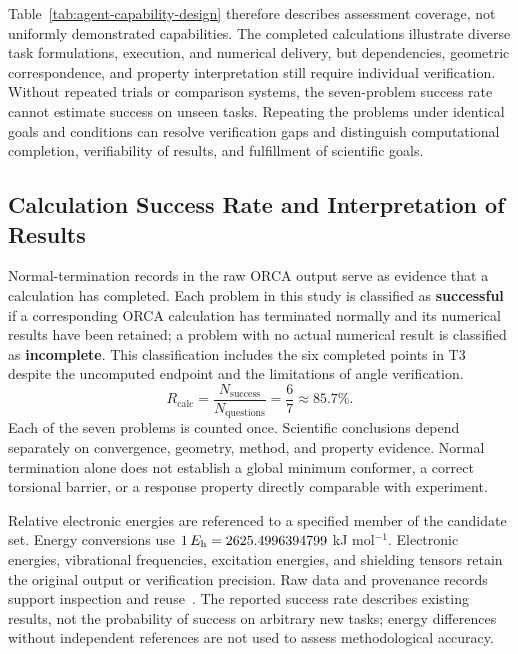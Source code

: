 Table~\ref{tab:agent-capability-design} therefore describes assessment coverage, not uniformly demonstrated capabilities.
The completed calculations illustrate diverse task formulations, execution, and numerical delivery,
but dependencies, geometric correspondence, and property interpretation still require individual verification.
Without repeated trials or comparison systems, the seven-problem success rate cannot estimate success on unseen tasks.
Repeating the problems under identical goals and conditions can resolve verification gaps
and distinguish computational completion, verifiability of results, and fulfillment of scientific goals.

\subsection{Calculation Success Rate and Interpretation of Results}
Normal-termination records in the raw ORCA output serve as evidence that a calculation has completed.
Each problem in this study is classified as \textbf{successful} if a corresponding ORCA calculation has terminated normally
and its numerical results have been retained; a problem with no actual numerical result is classified as \textbf{incomplete}.
This classification includes the six completed points in T3 despite the uncomputed endpoint and the limitations of angle verification.
\begin{equation}
  R_{\mathrm{calc}}=\frac{N_{\mathrm{success}}}{N_{\mathrm{questions}}}
  =\frac{6}{7}\approx85.7\%.
  \label{eq:success-rate}
\end{equation}
Each of the seven problems is counted once.
Scientific conclusions depend separately on convergence, geometry, method, and property evidence.
Normal termination alone does not establish a global minimum conformer, a correct torsional barrier,
or a response property directly comparable with experiment.

Relative electronic energies are referenced to a specified member of the candidate set.
Energy conversions use $1\,E_{\mathrm h}=2625.4996394799$ kJ mol$^{-1}$.
Electronic energies, vibrational frequencies, excitation energies, and shielding tensors retain the original output or verification precision.
Raw data and provenance records support inspection and reuse~\cite{fair}.
The reported success rate describes existing results, not the probability of success on arbitrary new tasks;
energy differences without independent references are not used to assess methodological accuracy.

